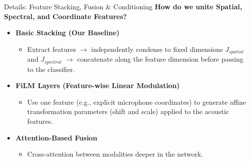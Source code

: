 \documentclass[8pt,hyperref={pdfpagelabels=true},xcolor=table,aspectratio=169]{beamer}
\begin{document}
\begin{frame}{Details: Feature Stacking, Fusion \& Conditioning}
    \textbf{How do we unite Spatial, Spectral, and Coordinate Features?}
    \vspace{0.5em}
    \begin{itemize}
        \item \textbf{Basic Stacking (Our Baseline)}
              \begin{itemize}
                  \item Extract features $\rightarrow$ independently condense to fixed dimensions $J_{spatial}$ and $J_{spectral}$ $\rightarrow$ concatenate along the feature dimension before passing to the classifier.
              \end{itemize}
              \vspace{0.5em}
        \item \textbf{FiLM Layers (Feature-wise Linear Modulation)}
              \begin{itemize}
                  \item Use one feature (e.g., explicit microphone coordinates) to generate affine transformation parameters (shift and scale) applied to the acoustic features.
              \end{itemize}
              \vspace{0.5em}
        \item \textbf{Attention-Based Fusion}
              \begin{itemize}
                  \item Cross-attention between modalities deeper in the network.
              \end{itemize}
    \end{itemize}
\end{frame}
\end{document}

